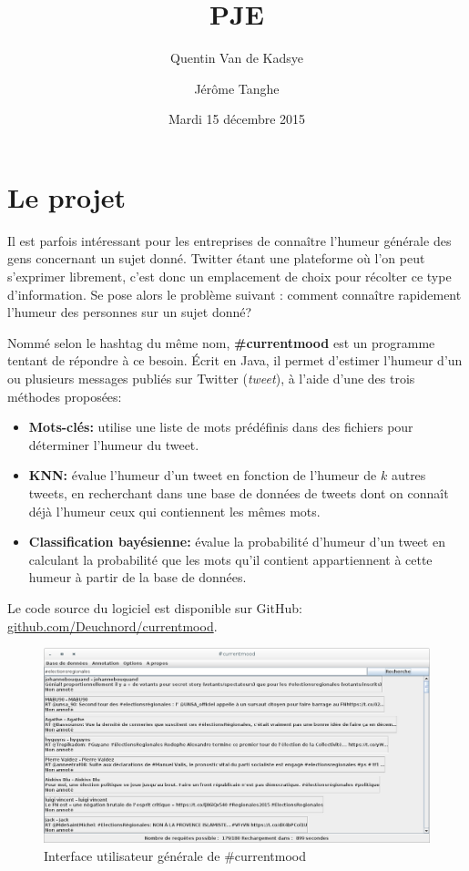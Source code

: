 \documentclass[12pt,a4paper]{report}
\title{PJE\\\CMName}
\author{Quentin Van de Kadsye \and Jérôme Tanghe}
\date{Mardi 15 décembre 2015}
\newcommand{\CMName}{\#currentmood}
\begin{document}
\maketitle

\tableofcontents


\chapter{Le projet}

Il est parfois intéressant pour les entreprises de connaître l'humeur générale
des gens concernant un sujet donné. Twitter étant une plateforme où l'on peut
s'exprimer librement, c'est donc un emplacement de choix pour récolter ce type
d'information. Se pose alors le problème suivant : comment connaître rapidement
l'humeur des personnes sur un sujet donné?

Nommé selon le hashtag du même nom, \textbf{\CMName} est un programme tentant de
répondre à ce besoin. Écrit en Java, il permet d'estimer l'humeur d'un ou
plusieurs messages publiés sur Twitter (\textit{tweet}), à l'aide d'une des trois méthodes proposées:

\begin{itemize}
	\item
		\textbf{Mots-clés:} utilise une liste de mots prédéfinis dans des
		fichiers pour déterminer l'humeur du tweet.
	\item
		\textbf{KNN:} évalue l'humeur d'un tweet en fonction de l'humeur de $k$
		autres tweets, en recherchant dans une base de données de tweets dont on
		connaît déjà l'humeur ceux qui contiennent les mêmes mots.
	\item
		\textbf{Classification bayésienne:} évalue la probabilité d'humeur d'un
		tweet en calculant la probabilité que les mots qu'il contient
		appartiennent à cette humeur à partir de la base de données.
\end{itemize}

Le code source du logiciel est disponible sur GitHub:
\href{http://github.com/Deuchnord/currentmood}{github.com/Deuchnord/currentmood}.

\begin{figure}
	\includegraphics[width=\textwidth]{img/capture-currentmood-ui.png}
	\caption{Interface utilisateur générale de \CMName}
	\label{cm_ui}
\end{figure}
\end{document}
